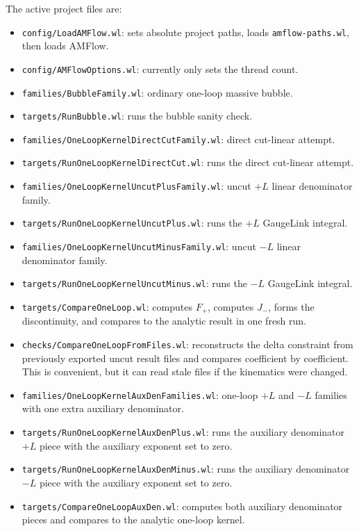 \documentclass[11pt]{article}
\newcommand{\WL}[1]{\texttt{#1}}
\begin{document}
The active project files are:
\begin{itemize}
  \item \WL{config/LoadAMFlow.wl}: sets absolute project paths, loads
        \WL{amflow-paths.wl}, then loads AMFlow.
  \item \WL{config/AMFlowOptions.wl}: currently only sets the thread count.
  \item \WL{families/BubbleFamily.wl}: ordinary one-loop massive bubble.
  \item \WL{targets/RunBubble.wl}: runs the bubble sanity check.
  \item \WL{families/OneLoopKernelDirectCutFamily.wl}: direct cut-linear attempt.
  \item \WL{targets/RunOneLoopKernelDirectCut.wl}: runs the direct cut-linear attempt.
  \item \WL{families/OneLoopKernelUncutPlusFamily.wl}: uncut \(+L\) linear
        denominator family.
  \item \WL{targets/RunOneLoopKernelUncutPlus.wl}: runs the \(+L\) GaugeLink
        integral.
  \item \WL{families/OneLoopKernelUncutMinusFamily.wl}: uncut \(-L\) linear
        denominator family.
  \item \WL{targets/RunOneLoopKernelUncutMinus.wl}: runs the \(-L\) GaugeLink
        integral.
  \item \WL{targets/CompareOneLoop.wl}: computes \(F_+\),
        computes \(J_-\), forms the discontinuity, and compares to the
        analytic result in one fresh run.
  \item \WL{checks/CompareOneLoopFromFiles.wl}: reconstructs the
        delta constraint from previously exported uncut result files and
        compares coefficient by coefficient. This is convenient, but it can
        read stale files if the kinematics were changed.
  \item \WL{families/OneLoopKernelAuxDenFamilies.wl}: one-loop \(+L\) and
        \(-L\) families with one extra auxiliary denominator.
  \item \WL{targets/RunOneLoopKernelAuxDenPlus.wl}: runs the auxiliary
        denominator \(+L\) piece with the auxiliary exponent set to zero.
  \item \WL{targets/RunOneLoopKernelAuxDenMinus.wl}: runs the auxiliary
        denominator \(-L\) piece with the auxiliary exponent set to zero.
  \item \WL{targets/CompareOneLoopAuxDen.wl}: computes both auxiliary
        denominator pieces and compares to the analytic one-loop kernel.

\end{itemize}
\end{document}
